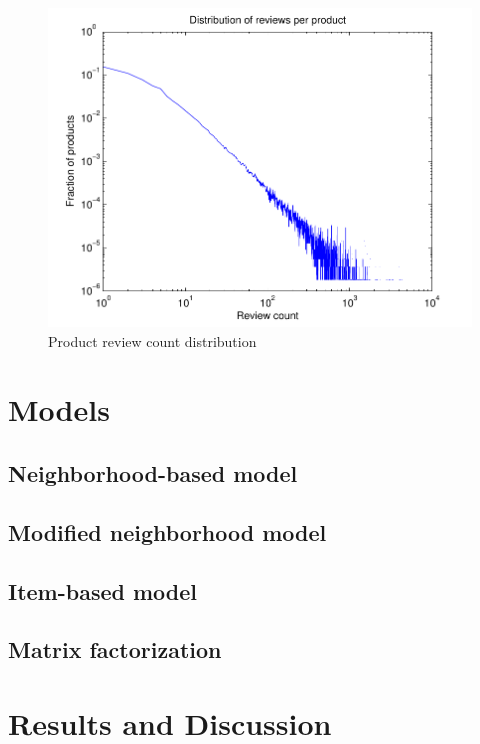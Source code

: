 \documentclass[letterpaper, 10 pt, conference]{ieeeconf}
\begin{document}
\begin{figure}[h]
\includegraphics[scale=0.6]{images/product_hist.pdf}
\caption{Product review count distribution}
\label{fig:producthist}
\end{figure}

\section{Models}
\label{sec:models}

\subsection{Neighborhood-based model}
\subsection{Modified neighborhood model}
\subsection{Item-based model}
\subsection{Matrix factorization}

\section{Results and Discussion}
\label{sec:results}
\end{document}
